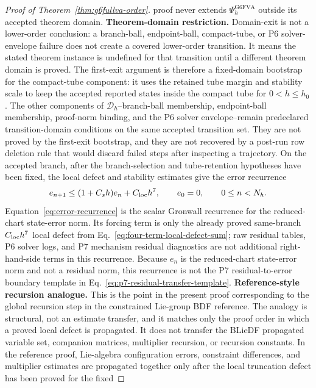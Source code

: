 \documentclass[preprint,12pt]{elsarticle}
\begin{document}
\begin{proof}[Proof of Theorem~\ref{thm:g6fullva-order}]
proof never extends
\(\Psi_h^{\mathrm{G6FVA}}\) outside its accepted theorem domain.
\noindent\textbf{Theorem-domain restriction.}
Domain-exit is not a lower-order conclusion: a branch-ball, endpoint-ball,
compact-tube, or P6 solver-envelope failure does not create a covered
lower-order transition. It means the stated theorem instance is undefined for
that transition until a different theorem domain is proved. The first-exit
argument is therefore a fixed-domain bootstrap for the compact-tube component:
it uses the retained tube margin and stability scale to keep the accepted
reported states inside the compact tube for \(0<h\le h_0\).  The other
components of \(\mathcal D_h\)--branch-ball membership, endpoint-ball
membership, proof-norm binding, and the P6 solver envelope--remain
predeclared transition-domain conditions on the same accepted transition set.
They are not proved by the first-exit bootstrap, and they are not recovered by
a post-run row deletion rule that would discard failed steps after inspecting a
trajectory.
On the accepted branch, after the branch-selection and tube-retention
hypotheses have been fixed, the local defect and stability estimates give the
error recurrence
\begin{equation}
\label{eq:error-recurrence}
  e_{n+1}\le (1+C_s h)e_n+C_{\rm loc}h^7,\qquad e_0=0,
  \qquad 0\le n<N_h .
\end{equation}
Equation~\eqref{eq:error-recurrence} is the scalar Gronwall recurrence
for the reduced-chart state-error norm.
Its forcing term is only the already proved same-branch \(C_{\rm loc}h^7\)
local defect from Eq.~\eqref{eq:four-term-local-defect-sum};
raw residual tables, P6 solver logs, and P7 mechanism residual diagnostics are
not additional right-hand-side terms in this recurrence.
Because \(e_n\) is the reduced-chart state-error norm and not a residual norm, this
recurrence is not the P7 residual-to-error boundary template in
Eq.~\eqref{eq:p7-residual-transfer-template}.
\noindent\textbf{Reference-style recursion analogue.}
This is the point in the present proof corresponding to the global recursion
step in the constrained Lie-group BDF reference.  The analogy is structural,
not an estimate transfer, and it matches only the proof order in which a
proved local defect is propagated.  It does not transfer the BLieDF propagated
variable set, companion matrices, multiplier recursion, or recursion constants.
In the reference proof, Lie-algebra configuration
errors, constraint differences, and multiplier estimates are propagated
together only after the local truncation defect has been proved for the fixed

\end{proof}
\end{document}
